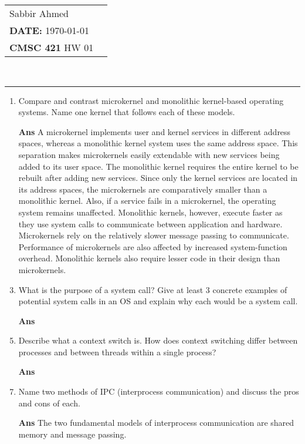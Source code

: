 \documentclass[paper=usletter, fontsize=12pt]{extarticle}
\newcommand{\documentinfo}[5]{
    \begin{centering}
        \parbox{2in}{
        \begin{spacing}{1}
            \begin{flushleft}
                \begin{tabular}{l l}
                    #1 \\
                    #2 \\
                    #3 \\
                \end{tabular}\\
                \rule{\textwidth}{1pt}
            \end{flushleft}
        \end{spacing}
        }
    \end{centering}
}
\begin{document}
    \documentinfo{Sabbir Ahmed}{\textbf{DATE:} \today}{\textbf{CMSC 421} HW 01}
    \vspace{-0.2in}

    \begin{enumerate}[label=\textbf{\arabic*}]

        \item Compare and contrast microkernel and monolithic kernel-based
        operating systems. Name one kernel that follows each of these models.
        \item[\textbf{Ans}]
        A microkernel implements user and kernel services in different address
        spaces, whereas a monolithic kernel system uses the same address space.
        This separation makes microkernels easily extendable with new services
        being added to its user space. The monolithic kernel requires the
        entire kernel to be rebuilt after adding new services. Since only the
        kernel services are located in its address spaces, the microkernels are
        comparatively smaller than a monolithic kernel. Also, if a service
        fails in a microkernel, the operating system remains unaffected.
        Monolithic kernels, however, execute faster as they use system calls to
        communicate between application and hardware. Microkernels rely on the
        relatively slower message passing to communicate. Performance of
        microkernels are also affected by increased system-function overhead.
        Monolithic kernels also require lesser code in their design than
        microkernels.
        \vspace{0.2in}

        \item What is the purpose of a system call? Give at least 3 concrete
        examples of potential system calls in an OS and explain why each would
        be a system call.
        \item[\textbf{Ans}]
        \vspace{0.2in}

        \item Describe what a context switch is. How does context switching
        differ between processes and between threads within a single process?
        \item[\textbf{Ans}]
        \vspace{0.2in}

        \item Name two methods of IPC (interprocess communication) and discuss
        the pros and cons of each.
        \item[\textbf{Ans}]
            The two fundamental models of interprocess communication are shared
            memory and message passing.
        \vspace{0.2in}


\end{enumerate}
\end{document}
